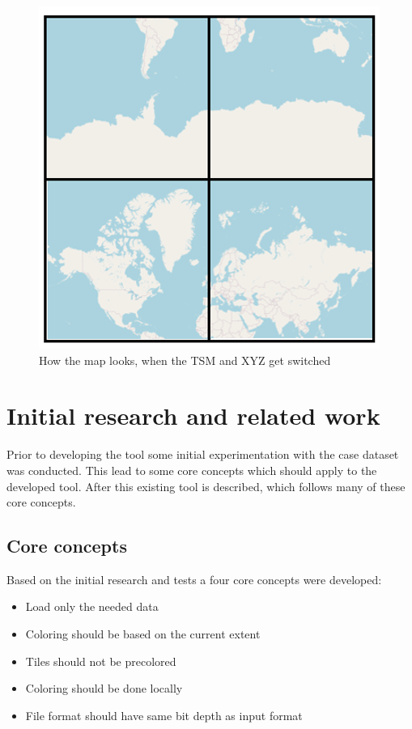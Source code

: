 \begin{figure} [H]
	\centering
	\includegraphics[width=.8\textwidth]{Pictures/SlippyInTMS}
	\caption{How the map looks, when the TSM and XYZ get switched}
	\label{SlippyInTMS}
\end{figure}

\chapter{Initial research and related work}

Prior to developing the tool some initial experimentation with the case dataset was conducted. This lead to some core concepts which should apply to the developed tool. After this existing tool is described, which follows many of these core concepts.

\section{Core concepts}

Based on the initial research and tests a four core concepts were developed:
\begin{itemize}
	\item Load only the needed data
	\item Coloring should be based on the current extent
	\item Tiles should not be precolored
	\item Coloring should be done locally
	\item File format should have same bit depth as input format
\end{itemize}


